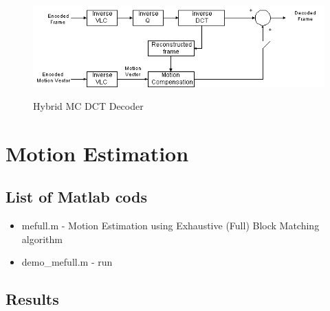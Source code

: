 \documentclass[article,oneside]{memoir}
\begin{document}
\begin{center}
\begin{figure}[ht]  
  \includegraphics[width=17cm]{../images/HybridMCDCTDecoder.png}\\
 \caption{Hybrid MC DCT Decoder}
\end{figure}
 
\end{center}

\newpage

\section{Motion Estimation}

\subsection{List of Matlab cods}

\begin{itemize}
\item mefull.m - Motion Estimation using Exhaustive (Full) Block Matching algorithm
\item demo\_mefull.m - run
\end{itemize}

\subsection{Results}
\end{document}
